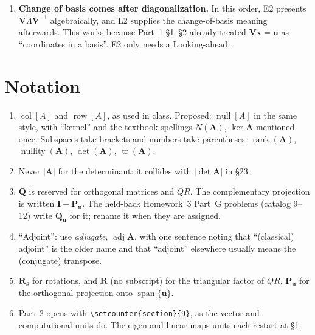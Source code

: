 \documentclass[11pt]{article}
\newcommand{\vc}[1]{\mathbf{#1}}
\newcommand{\mt}[1]{\mathbf{#1}}
\newcommand{\colsp}[1]{\operatorname{col}[#1]}
\newcommand{\rowsp}[1]{\operatorname{row}[#1]}
\newcommand{\nullsp}[1]{\operatorname{null}[#1]}
\DeclareMathOperator{\rank}{rank}
\DeclareMathOperator{\nullity}{nullity}
\DeclareMathOperator{\tr}{tr}
\DeclareMathOperator{\adj}{adj}
\DeclareMathOperator{\spanop}{span}
\begin{document}
\begin{enumerate}[label=\textbf{D\arabic*.},leftmargin=2.4em,itemsep=5pt]
        ($\mt{R}_\alpha\mt{R}_\beta$), \S25 ($\mt{R}_x\mt{R}_z$), and the
        Part~3 compositions. That reading is free from M1:
        $(\mt{A}\mt{B})\vc{x}=\mt{A}(\mt{B}\vc{x})$. L1 reverses the logic and
        derives the product rule \emph{from} composition, as specified. An
        alternative is to move L1~\S3 forward to sit beside \S13, where the
        gallery first composes motions. That would answer Part~1 \S8's
        ``why this rule'' as soon as it is needed and shorten the end of term,
        but it departs from the given order.
  \item \textbf{Change of basis comes after diagonalization.} In this order,
        E2 presents $\mt{V}\Lambda\mt{V}^{-1}$ algebraically, and L2 supplies
        the change-of-basis meaning afterwards. This works because Part~1
        \S1--\S2 already treated $\mt{V}\vc{x}=\vc{u}$ as ``coordinates in a
        basis''. E2 only needs a Looking-ahead.
\end{enumerate}

\section{Notation}
\begin{enumerate}[label=\textbf{N\arabic*.},leftmargin=2.4em,itemsep=4pt]
  \item $\colsp{A}$ and $\rowsp{A}$, as used in class. Proposed: $\nullsp{A}$
        in the same style, with ``kernel'' and the textbook spellings
        $N(\mt{A})$, $\ker\mt{A}$ mentioned once. Subspaces take brackets and
        numbers take parentheses: $\rank(\mt{A})$, $\nullity(\mt{A})$,
        $\det(\mt{A})$, $\tr(\mt{A})$.
  \item Never $|\mt{A}|$ for the determinant: it collides with
        $|\det\mt{A}|$ in \S23.
  \item $\mt{Q}$ is reserved for orthogonal matrices and $QR$. The
        complementary projection is written $\mt{I}-\mt{P}_{\vc{u}}$. The
        held-back Homework~3 Part~G problems (catalog 9--12) write
        $\mt{Q}_{\vc{u}}$ for it; rename it when they are assigned.
  \item ``Adjoint'': use \emph{adjugate}, $\adj\mt{A}$, with one sentence
        noting that ``(classical) adjoint'' is the older name and that
        ``adjoint'' elsewhere usually means the (conjugate) transpose.
  \item $\mt{R}_\theta$ for rotations, and $\mt{R}$ (no subscript) for the triangular
        factor of $QR$. $\mt{P}_{\vc{u}}$ for the orthogonal projection onto
        $\spanop\{\vc{u}\}$.
  \item Part~2 opens with \verb|\setcounter{section}{9}|, as the vector and
        computational units do. The eigen and linear-maps units each restart
        at \S1.
\end{enumerate}
\end{document}
